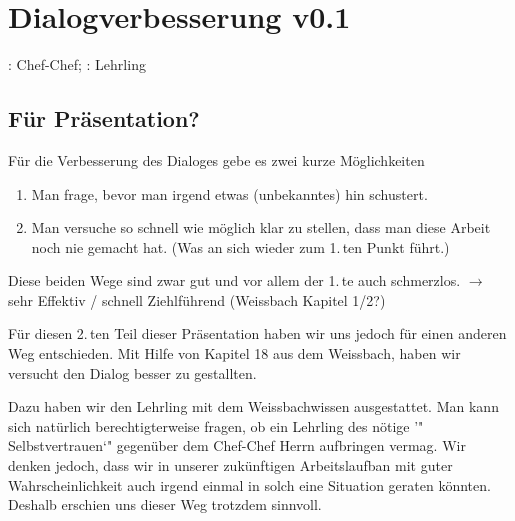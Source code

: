 \section{Dialogverbesserung v0.1}
\herrcc: Chef-Chef; \herrl: Lehrling\\

\subsection{Für Präsentation?}
Für die Verbesserung des Dialoges gebe es zwei kurze Möglichkeiten
\begin{enumerate}
  \item Man frage, bevor man irgend etwas (unbekanntes) hin schustert.
  \item Man versuche so schnell wie möglich klar zu stellen,
          dass man diese Arbeit noch nie gemacht hat. (Was an sich wieder
          zum 1.\,ten Punkt führt.)
\end{enumerate}

Diese beiden Wege sind zwar gut und vor allem der 1.\,te auch schmerzlos.
$\rightarrow$ sehr Effektiv / schnell Ziehlführend (Weissbach Kapitel 1/2?)

Für diesen 2.\,ten Teil dieser Präsentation haben wir uns jedoch für einen anderen
Weg entschieden.  Mit Hilfe von Kapitel 18 aus dem Weissbach, haben wir versucht
den Dialog besser zu gestallten.

Dazu haben wir den Lehrling \herrl mit dem Weissbachwissen ausgestattet.  Man kann
sich natürlich berechtigterweise fragen, ob ein Lehrling des nötige '" Selbstvertrauen`"
gegenüber dem Chef-Chef Herrn \herrcc aufbringen vermag.  Wir denken jedoch, dass wir
in unserer zukünftigen Arbeitslaufban mit guter Wahrscheinlichkeit auch irgend einmal
in solch eine Situation geraten könnten. Deshalb erschien uns dieser Weg trotzdem sinnvoll.

